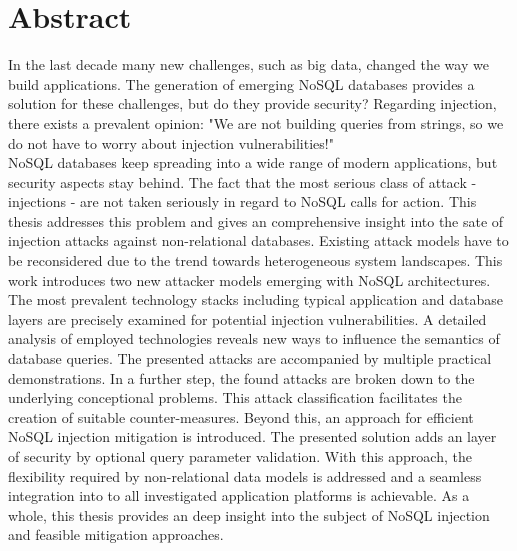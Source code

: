 \chapter*{Abstract} %
In the last decade many new challenges, such as big data, changed the way we build applications. The generation of emerging NoSQL databases provides a solution for these challenges, but do they provide security? Regarding injection, there exists a prevalent opinion: "We are not building queries from strings, so we do not have to worry about injection vulnerabilities!" \\

NoSQL databases keep spreading into a wide range of modern applications, but security aspects stay behind. The fact that the most serious class of attack - injections - are not taken seriously in regard to NoSQL calls for action. This thesis addresses this problem and gives an comprehensive insight into the sate of injection attacks against non-relational databases. Existing attack models have to be reconsidered due to the trend towards heterogeneous system landscapes. This work introduces two new attacker models emerging with NoSQL architectures. The most prevalent technology stacks including typical application and database layers are precisely examined for potential injection vulnerabilities. A detailed analysis of employed technologies reveals new ways to influence the semantics of database queries. The presented attacks are accompanied by multiple practical demonstrations. In a further step, the found attacks are broken down to the underlying conceptional problems. This attack classification facilitates the creation of suitable counter-measures. Beyond this, an approach for efficient NoSQL injection mitigation is introduced. The presented solution adds an layer of security by optional query parameter validation. With this approach, the flexibility required by non-relational data models is addressed and a seamless integration into to all investigated application platforms is achievable. As a whole, this thesis provides an deep insight into the subject of NoSQL injection and feasible mitigation approaches.